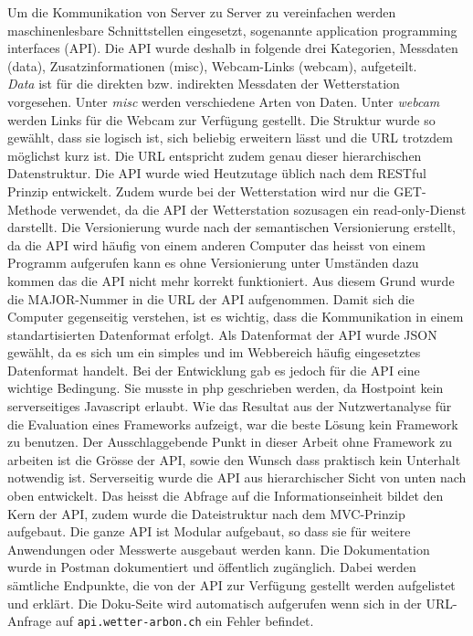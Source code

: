 \documentclass[10pt]{article}
\begin{document}
\begin{multicols}{2}
Um die Kommunikation von Server zu Server zu vereinfachen werden maschinenlesbare Schnittstellen eingesetzt, sogenannte application programming interfaces (API). Die API wurde deshalb in folgende drei Kategorien, Messdaten (data), Zusatzinformationen (misc), Webcam-Links (webcam), aufgeteilt.\\
\emph{Data} ist für die direkten bzw. indirekten Messdaten der Wetterstation vorgesehen. Unter \emph{misc} werden verschiedene Arten von Daten. Unter \emph{webcam} werden Links für die Webcam zur Verfügung gestellt. Die Struktur wurde so gewählt, dass sie logisch ist, sich beliebig erweitern lässt und die URL trotzdem möglichst kurz ist. Die URL entspricht zudem genau dieser hierarchischen Datenstruktur. Die API wurde wied Heutzutage üblich nach dem RESTful Prinzip entwickelt. Zudem wurde bei  der Wetterstation wird nur die GET-Methode verwendet, da die API der Wetterstation sozusagen ein read-only-Dienst darstellt. Die Versionierung wurde nach der semantischen Versionierung erstellt, da die API wird häufig von einem anderen Computer das heisst von einem Programm aufgerufen kann es ohne Versionierung unter Umständen dazu kommen das die API nicht mehr korrekt funktioniert. Aus diesem Grund wurde die MAJOR-Nummer in die URL der API aufgenommen. Damit sich die Computer gegenseitig verstehen, ist es wichtig, dass die Kommunikation in einem standartisierten Datenformat erfolgt. Als Datenformat der API wurde JSON gewählt, da es sich um ein simples und im Webbereich häufig eingesetztes Datenformat handelt. Bei der Entwicklung gab es jedoch für die API eine wichtige Bedingung. Sie musste in php geschrieben werden, da Hostpoint kein serverseitiges Javascript erlaubt.  Wie das Resultat aus der Nutzwertanalyse für die Evaluation eines Frameworks aufzeigt, war die beste Lösung kein Framework zu benutzen. Der Ausschlaggebende Punkt in dieser Arbeit ohne Framework zu arbeiten ist die Grösse der API, sowie den Wunsch dass praktisch kein Unterhalt notwendig ist. Serverseitig wurde die API aus hierarchischer Sicht von unten nach oben entwickelt. Das heisst die Abfrage auf die Informationseinheit bildet den Kern der API, zudem wurde die Dateistruktur nach dem MVC-Prinzip aufgebaut. Die ganze API ist Modular aufgebaut, so dass sie für weitere Anwendungen oder Messwerte ausgebaut werden kann. Die Dokumentation wurde in Postman dokumentiert und öffentlich zugänglich.  Dabei werden sämtliche Endpunkte, die von der API zur Verfügung gestellt werden aufgelistet und erklärt. Die Doku-Seite wird automatisch aufgerufen wenn sich in der URL-Anfrage auf \texttt{api.wetter-arbon.ch} ein Fehler befindet.\\


\end{multicols}
\end{document}
